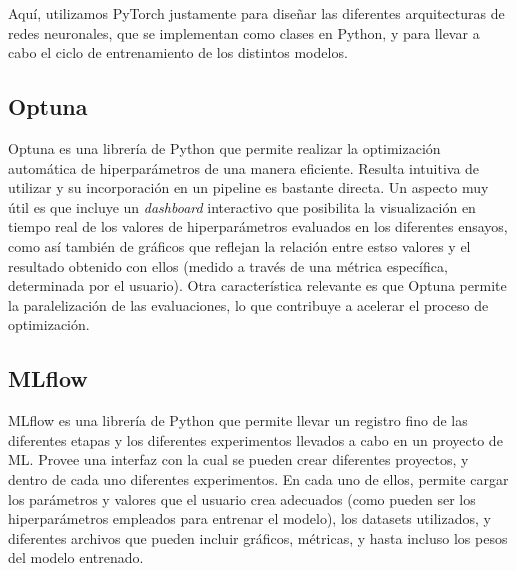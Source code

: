 \documentclass[../../main.tex]{subfiles}
\begin{document}
Aquí, utilizamos PyTorch justamente para diseñar las diferentes arquitecturas de redes
neuronales, que se implementan como clases en Python, y para llevar a cabo el ciclo de
entrenamiento de los distintos modelos.

\subsection{Optuna}
Optuna es una librería de Python que permite realizar la optimización automática de
hiperparámetros de una manera eficiente. Resulta intuitiva de utilizar y su incorporación
en un pipeline es bastante directa. Un aspecto muy útil es que incluye un
\textit{dashboard} interactivo que posibilita la visualización en tiempo real de los
valores de hiperparámetros evaluados en los diferentes ensayos, como así también de
gráficos que reflejan la relación entre estso valores y el resultado obtenido con ellos
(medido a través de una métrica específica, determinada por el usuario). Otra
característica relevante es que Optuna permite la paralelización de las evaluaciones, lo
que contribuye a acelerar el proceso de optimización.

\subsection{MLflow}
MLflow es una librería de Python que permite llevar un registro fino de las diferentes
etapas y los diferentes experimentos llevados a cabo en un proyecto de ML. Provee
una interfaz con la cual se pueden crear diferentes proyectos, y dentro de cada uno
diferentes experimentos. En cada uno de ellos, permite cargar los parámetros y valores
que el usuario crea adecuados (como pueden ser los hiperparámetros empleados para
entrenar el modelo), los datasets utilizados, y diferentes archivos que pueden incluir
gráficos, métricas, y hasta incluso los pesos del modelo entrenado.
\end{document}
